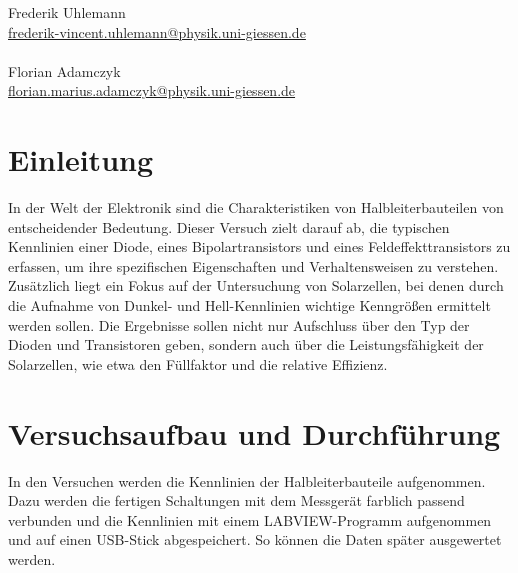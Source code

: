 \documentclass[12pt,a4paper,ngerman]{report}
\begin{document}
\begin{titlepage}
\begin{minipage}{0.49\textwidth}
\begin{flushright}
				\large{Frederik Uhlemann}\\
				\small{\href{mailto:frederik-vincent.uhlemann@physik.uni-giessen.de}{frederik-vincent.uhlemann@physik.uni-giessen.de}\\~\\
				}
				\large{Florian Adamczyk} \\
				\small{\href{mailto:florian.marius.adamczyk@physik.uni-giessen.de}{florian.marius.adamczyk@physik.uni-giessen.de}\\
			}
		\end{flushright}
	\end{minipage}
	
	\end{titlepage}
	
\setcounter{secnumdepth}{3}
\setcounter{tocdepth}{4}
\tableofcontents


	
\chapter*{Einleitung}
	
	In der Welt der Elektronik sind die Charakteristiken von Halbleiterbauteilen von entscheidender Bedeutung. Dieser Versuch zielt darauf ab, die typischen Kennlinien einer Diode, eines Bipolartransistors und eines Feldeffekttransistors zu erfassen, um ihre spezifischen Eigenschaften und Verhaltensweisen zu verstehen. Zusätzlich liegt ein Fokus auf der Untersuchung von Solarzellen, bei denen durch die Aufnahme von Dunkel- und Hell-Kennlinien wichtige Kenngrößen ermittelt werden sollen. Die Ergebnisse sollen nicht nur Aufschluss über den Typ der Dioden und Transistoren geben, sondern auch über die Leistungsfähigkeit der Solarzellen, wie etwa den Füllfaktor und die relative Effizienz.



\chapter{Versuchsaufbau und Durchführung}
	In den Versuchen werden die Kennlinien der Halbleiterbauteile aufgenommen. Dazu werden die fertigen Schaltungen mit dem Messgerät farblich passend verbunden und die Kennlinien mit einem LABVIEW-Programm aufgenommen und auf einen USB-Stick abgespeichert. So können die Daten später ausgewertet werden.\\
\end{document}
